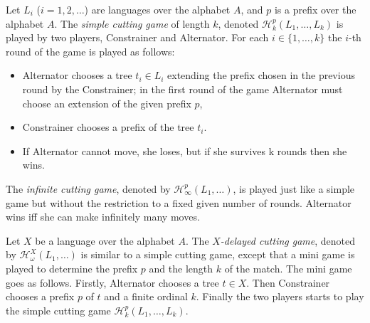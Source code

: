 Let $L_i$ ($i=1,2,\dots$) are languages over the alphabet $A$, and $p$ is a prefix over the alphabet $A$. 
The \emph{simple cutting game} of length $k$, denoted $\mathcal{H}^p_k(L_1,\ldots,L_k)$ is played by two players, Constrainer and Alternator. 
For each $i \in \{1, \dots, k \}$ the $i$-th round of the game is played as follows:
\begin{itemize}
\item Alternator chooses a tree $t_i \in L_i$ extending the prefix chosen in the previous round by the Constrainer; in the first round of the game Alternator must choose an extension of the given prefix $p$,
\item Constrainer chooses a prefix of the tree $t_i$.
\item If Alternator cannot move, she loses, but if she survives k rounds then she wins.
\end{itemize}
The \emph{infinite cutting game}, denoted by $\mathcal{H}^p_\infty(L_1,\dots)$, is played just like a simple game but without the restriction to a fixed given number of rounds. Alternator wins iff she can make infinitely many moves.

Let $X$ be a language over the alphabet $A$.  The \emph{$X$-delayed cutting game}, denoted by 
$\mathcal{H}^{X}_\omega(L_1,\dots)$ is similar to a simple cutting game, except that a mini game is played to determine the prefix $p$ and the length $k$ of the match. 
The mini game goes as follows. Firstly, Alternator chooses a tree $t \in X$. Then Constrainer chooses a prefix $p$ of $t$ and a finite ordinal $k$. Finally the two players starts to play the simple cutting game $\mathcal{H}^p_k(L_1,\dots,L_k)$. 

